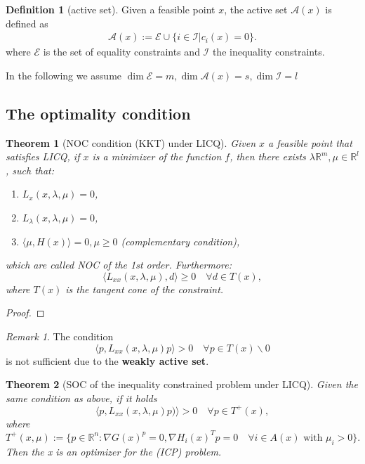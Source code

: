 \documentclass[a4paper,11pt,fleqn, draft]{book}
\newtheorem{theorem}{Theorem}[section]
\theoremstyle{definition}
\newtheorem{definition}{Definition}[section]
\theoremstyle{remark}
\newtheorem*{remark}{Remark}
\newcommand{\R}{\mathbb{R}}
\newcommand{\Rn}{\mathbb{R}^n}
\begin{document}
\begin{definition}[active set]
Given a feasible point $x$, the active set $\mathcal{A}(x)$ is defined as 
\begin{align*}
	\mathcal{A}(x):= \mathcal{E} \cup \{i \in \mathcal{I} | c_i(x) = 0\}.
\end{align*}
where $\mathcal{E}$ is the set of equality constraints and $\mathcal{I}$ the inequality constraints. 
\end{definition}
In the following we assume $\dim \mathcal{E} = m, \dim \mathcal{A}(x) = s, \dim \mathcal{I} = l$

\subsection{The optimality condition}
\begin{theorem}[NOC condition (KKT) under LICQ]
	Given $x$ a feasible point that satisfies LICQ, if $x$ is a minimizer of the function $f$, then there exists $\lambda \R^m, \mu \in \R^l$, such that: 
	\begin{enumerate}
		\item $L_x(x, \lambda, \mu) = 0$,
		\item $L_\lambda(x, \lambda, \mu) = 0$,
		\item $\langle \mu, H(x) \rangle = 0, \mu \ge 0$ (complementary condition),
	\end{enumerate}
	which are called NOC of the 1st order. Furthermore: 
	\begin{equation}
		\langle L_{xx} (x, \lambda, \mu), d \rangle \ge 0 \quad \forall d \in T(x),
	\end{equation}
	where 
	$T(x)$ is the tangent cone of the constraint.  
\end{theorem}
\begin{proof}
\end{proof}
\begin{remark}
The condition 
\[
\langle p, L_{xx} ( x, \lambda, \mu) p \rangle > 0 \quad \forall p \in T(x)\backslash 0
 \]
is not sufficient due to the \textbf{weakly active set}. 
\end{remark}

\begin{theorem}[SOC of the inequality constrained problem under LICQ]
	Given the same condition as above, if it holds
	\begin{equation}
		\langle p, L_{xx}(x, \lambda, \mu) p) \rangle > 0 \quad \forall p \in T^+(x),
	\end{equation}
	where 
	\[
	T^+(x, \mu):= \{ p \in \Rn: \nabla G(x)^p = 0, \nabla H_i(x)^T p = 0 \quad \forall i \in A(x) \text{ with } \mu_i > 0  \}.
	\]
	Then the x is an optimizer for the (ICP) problem.
\end{theorem}
\end{document}
